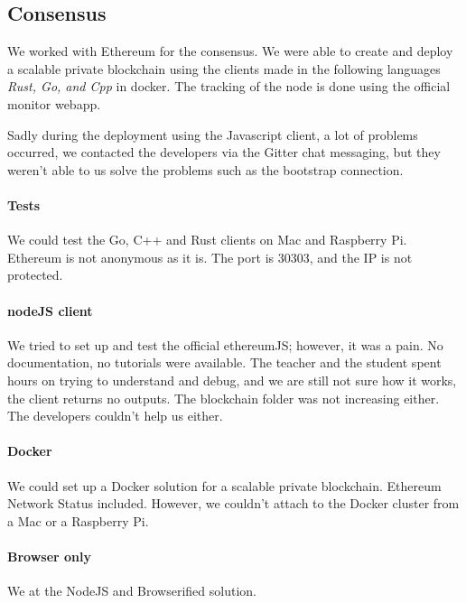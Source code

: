 
\subsection{Consensus}
We worked with Ethereum for the consensus. We were able to create and deploy a scalable private blockchain using the clients made in the following languages \textit{Rust, Go, and Cpp} in docker. The tracking of the node is done using the official monitor webapp.

Sadly during the deployment using the Javascript client, a lot of problems occurred, we contacted the developers via the Gitter chat messaging, but they weren't able to us solve the problems such as the bootstrap connection.

\paragraph{Tests} We could test the Go, C++ and Rust clients on Mac and Raspberry Pi. Ethereum is not anonymous as it is. The port is 30303, and the IP is not protected.

\paragraph{nodeJS client} We tried to set up and test the official ethereumJS; however, it was a pain. No documentation, no tutorials were available. The teacher and the student spent hours on trying to understand and debug, and we are still not sure how it works, the client returns no outputs. The blockchain folder was not increasing either. The developers couldn't help us either.

\paragraph{Docker} We could set up a Docker solution for a scalable private blockchain. Ethereum Network Status included. However, we couldn't attach to the Docker cluster from a Mac or a Raspberry Pi.


\paragraph{Browser only} We at the NodeJS and Browserified solution.

